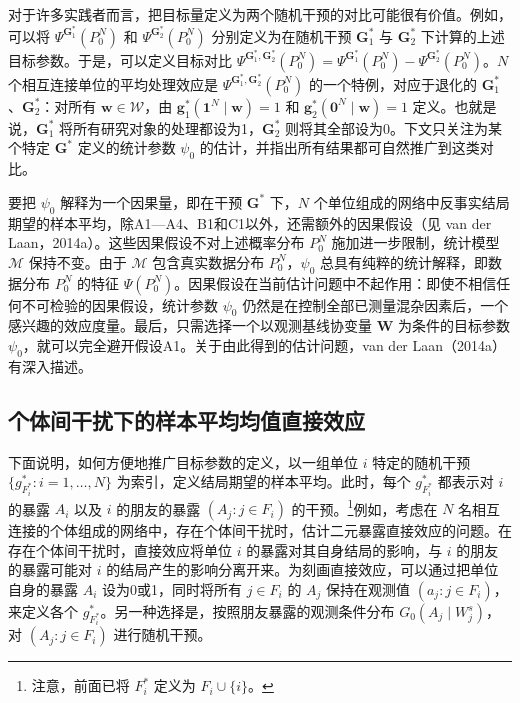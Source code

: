 对于许多实践者而言，把目标量定义为两个随机干预的对比可能很有价值。例如，可以将 $\Psi^{\bm G_1^*}(P_0^N)$ 和 $\Psi^{\bm G_2^*}(P_0^N)$ 分别定义为在随机干预 $\bm G_1^*$ 与 $\bm G_2^*$ 下计算的上述目标参数。于是，可以定义目标对比 $\Psi^{\bm G_1^*,\bm G_2^*}(P_0^N)=\Psi^{\bm G_1^*}(P_0^N)-\Psi^{\bm G_2^*}(P_0^N)$。$N$ 个相互连接单位的平均处理效应是 $\Psi^{\bm G_1^*,\bm G_2^*}(P_0^N)$ 的一个特例，对应于退化的 $\bm G_1^*$、$\bm G_2^*$：对所有 $\bm w\in\mathcal W$，由 $\bm g_1^*(\bm 1^N\mid\bm w)=1$ 和 $\bm g_2^*(\bm 0^N\mid\bm w)=1$ 定义。也就是说，$\bm G_1^*$ 将所有研究对象的处理都设为1，$\bm G_2^*$ 则将其全部设为0。下文只关注为某个特定 $\bm G^*$ 定义的统计参数 $\psi_0$ 的估计，并指出所有结果都可自然推广到这类对比。

要把 $\psi_0$ 解释为一个因果量，即在干预 $\bm G^*$ 下，$N$ 个单位组成的网络中反事实结局期望的样本平均，除A1—A4、B1和C1以外，还需额外的因果假设（见 van der Laan，2014a）。这些因果假设不对上述概率分布 $P_0^N$ 施加进一步限制，统计模型 $\mathcal M$ 保持不变。由于 $\mathcal M$ 包含真实数据分布 $P_0^N$，$\psi_0$ 总具有纯粹的统计解释，即数据分布 $P_0^N$ 的特征 $\Psi(P_0^N)$。因果假设在当前估计问题中不起作用：即使不相信任何不可检验的因果假设，统计参数 $\psi_0$ 仍然是在控制全部已测量混杂因素后，一个感兴趣的效应度量。最后，只需选择一个以观测基线协变量 $\bm W$ 为条件的目标参数 $\psi_0$，就可以完全避开假设A1。关于由此得到的估计问题，van der Laan（2014a）有深入描述。

\subsection{个体间干扰下的样本平均均值直接效应}

下面说明，如何方便地推广目标参数的定义，以一组单位 $i$ 特定的随机干预 $\{g_{F_i^*}^*:i=1,\ldots,N\}$ 为索引，定义结局期望的样本平均。此时，每个 $g_{F_i^*}^*$ 都表示对 $i$ 的暴露 $A_i$ 以及 $i$ 的朋友的暴露 $(A_j:j\in F_i)$ 的干预。\footnote{注意，前面已将 $F_i^*$ 定义为 $F_i\cup\{i\}$。}例如，考虑在 $N$ 名相互连接的个体组成的网络中，存在个体间干扰时，估计二元暴露直接效应的问题。在存在个体间干扰时，直接效应将单位 $i$ 的暴露对其自身结局的影响，与 $i$ 的朋友的暴露可能对 $i$ 的结局产生的影响分离开来。为刻画直接效应，可以通过把单位自身的暴露 $A_i$ 设为0或1，同时将所有 $j\in F_i$ 的 $A_j$ 保持在观测值 $(a_j:j\in F_i)$，来定义各个 $g_{F_i^*}^*$。另一种选择是，按照朋友暴露的观测条件分布 $G_0(A_j\mid W_j^s)$，对 $(A_j:j\in F_i)$ 进行随机干预。

